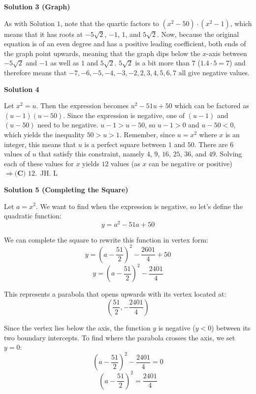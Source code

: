 \begin{enumerate}
 



\textbf{Solution 3 (Graph)}

As with Solution $1$, note that the quartic factors to $(x^2-50)\cdot(x^2-1)$, which means that it has roots at $-5\sqrt{2}$, $-1$, $1$, and $5\sqrt{2}$. Now, because the original equation is of an even degree and has a positive leading coefficient, both ends of the graph point upwards, meaning that the graph dips below the $x$-axis between $-5\sqrt{2}$ and $-1$ as well as $1$ and $5\sqrt{2}$. $5\sqrt{2}$ is a bit more than $7$ ($1.4\cdot 5=7$) and therefore means that $-7,-6,-5,-4,-3,-2,2,3,4,5,6,7$ all give negative values.

 



\textbf{Solution 4}

Let $x^{2}=u$. Then the expression becomes $u^{2}-51u+50$ which can be factored as $\left(u-1\right)\left(u-50\right)$. Since the expression is negative, one of $\left(u-1\right)$ and $\left(u-50\right)$ need to be negative. $u-1>u-50$, so $u-1>0$ and $u-50<0$, which yields the inequality $50>u>1$. Remember, since $u=x^{2}$ where $x$ is an integer, this means that $u$ is a perfect square between $1$ and $50$. There are $6$ values of $u$ that satisfy this constraint, namely $4$, $9$, $16$, $25$, $36$, and $49$. Solving each of these values for $x$ yields $12$ values (as $x$ can be negative or positive) $\Longrightarrow \boxed{\textbf {(C) } 12}$.~JH. L

 


 



\textbf{Solution 5 (Completing the Square)}

Let $a = x^2$. We want to find when the expression is negative, so let's define the quadratic function:
 \[y = a^2 - 51a + 50\]

 We can complete the square to rewrite this function in vertex form:
 \[y = \left(a - \frac{51}{2}\right)^2 - \frac{2601}{4} + 50\]
 \[y = \left(a - \frac{51}{2}\right)^2 - \frac{2401}{4}\]

 This represents a parabola that opens upwards with its vertex located at:
 \[\left(\frac{51}{2}, -\frac{2401}{4}\right)\]

 Since the vertex lies below the axis, the function $y$ is negative ($y < 0$) between its two boundary intercepts. To find where the parabola crosses the axis, we set $y = 0$:
 \[\left(a - \frac{51}{2}\right)^2 - \frac{2401}{4} = 0\]
 \[\left(a - \frac{51}{2}\right)^2 = \frac{2401}{4}\]


\end{enumerate}
